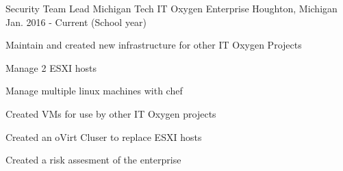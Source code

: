 \begin{cventries}
 \cventry
    {Security Team Lead} %
    {Michigan Tech IT Oxygen Enterprise} %
    {Houghton, Michigan} %
    {Jan. 2016 - Current (School year)} %
    {
      \begin{cvitems} %
        \item {Maintain and created new infrastructure for other IT Oxygen Projects}
        \item {Manage 2 ESXI hosts}
        \item {Manage multiple linux machines with chef}
        \item {Created VMs for use by other IT Oxygen projects}
	\item {Created an oVirt Cluser to replace ESXI hosts}
	\item {Created a risk assesment of the enterprise}
      \end{cvitems}
    }
\end{cventries}
